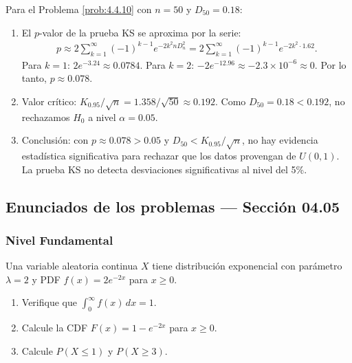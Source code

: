 \begin{solucion}
	\label{sol:4.4.10}
	Para el Problema \ref{prob:4.4.10} con $n = 50$ y $D_{50} = 0.18$:
	\begin{enumerate}
		\item El $p$-valor de la prueba KS se aproxima por la serie:
		\begin{align*}
			p \approx 2 \sum_{k=1}^{\infty}(-1)^{k-1} e^{-2k^{2} n D_{n}^{2}} = 2 \sum_{k=1}^{\infty}(-1)^{k-1} e^{-2k^{2} \cdot 1.62}.
		\end{align*}
		Para $k=1$: $2 e^{-3.24} \approx 0.0784$. Para $k=2$: $-2 e^{-12.96} \approx -2.3 \times 10^{-6} \approx 0$. Por lo tanto, $p \approx 0.078$.
		\item Valor crítico: $K_{0.95}/\sqrt{n} = 1.358/\sqrt{50} \approx 0.192$. Como $D_{50} = 0.18 < 0.192$, no rechazamos $H_{0}$ a nivel $\alpha = 0.05$.
		\item Conclusión: con $p \approx 0.078 > 0.05$ y $D_{50} < K_{0.95}/\sqrt{n}$, no hay evidencia estadística significativa para rechazar que los datos provengan de $U(0, 1)$. La prueba KS no detecta desviaciones significativas al nivel del 5\%. \quad \qedhere
	\end{enumerate}
\end{solucion}


\subsection*{Enunciados de los problemas --- Sección 04.05}

\subsubsection*{Nivel Fundamental}

\begin{problema}
	\label{prob:4.5.1}
	Una variable aleatoria continua $X$ tiene distribución exponencial con parámetro $\lambda = 2$ y PDF $f(x) = 2e^{-2x}$ para $x \ge 0$.
	\begin{enumerate}
		\item Verifique que $\int_{0}^{\infty} f(x)\,dx = 1$.
		\item Calcule la CDF $F(x) = 1 - e^{-2x}$ para $x \ge 0$.
		\item Calcule $P(X \le 1)$ y $P(X \ge 3)$.
	\end{enumerate}
\end{problema}

